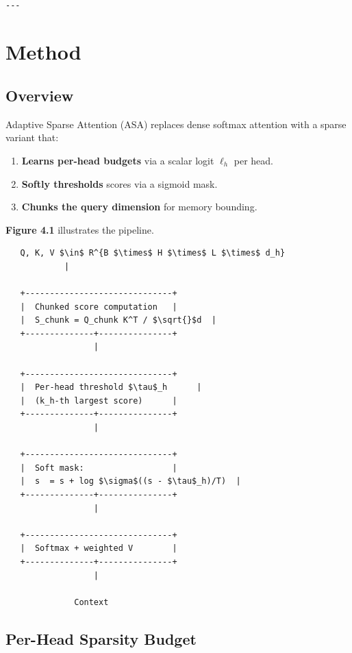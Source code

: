 \begin{lstlisting}

---
\end{lstlisting}


\section{Method}

\subsection{Overview}

Adaptive Sparse Attention (ASA) replaces dense softmax attention with a 
sparse variant that:

\begin{enumerate}
\item \textbf{Learns per-head budgets} via a scalar logit $\ell_h$ per head.
\item \textbf{Softly thresholds} scores via a sigmoid mask.
\item \textbf{Chunks the query dimension} for memory bounding.

\end{enumerate}
\textbf{Figure 4.1} illustrates the pipeline.

\begin{lstlisting}
   Q, K, V $\in$ R^{B $\times$ H $\times$ L $\times$ d_h}
            |
             
   +------------------------------+
   |  Chunked score computation   |
   |  S_chunk = Q_chunk K^T / $\sqrt{}$d  |
   +--------------+---------------+
                  |
                   
   +------------------------------+
   |  Per-head threshold $\tau$_h      |
   |  (k_h-th largest score)      |
   +--------------+---------------+
                  |
                   
   +------------------------------+
   |  Soft mask:                  |
   |  s  = s + log $\sigma$((s - $\tau$_h)/T)  |
   +--------------+---------------+
                  |
                   
   +------------------------------+
   |  Softmax + weighted V        |
   +--------------+---------------+
                  |
                   
              Context
\end{lstlisting}

\subsection{Per-Head Sparsity Budget}


